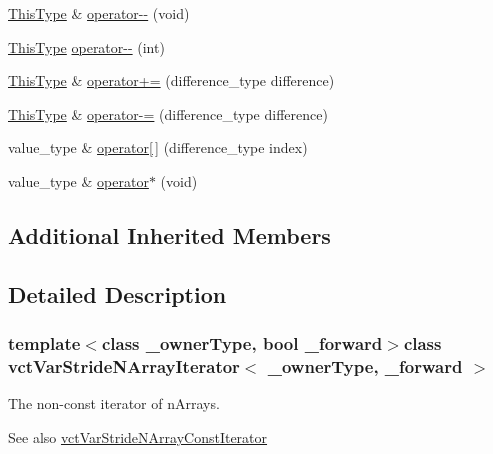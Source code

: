 \begin{DoxyCompactItemize}
\item 
\hyperlink{classvct_var_stride_n_array_const_iterator_ac729d2af265785aad6fdd43a70fbffdb}{This\+Type} \& \hyperlink{classvct_var_stride_n_array_iterator_a6dd95ef8683bfe4f0390b1d8596a858a}{operator-\/-\/} (void)
\item 
\hyperlink{classvct_var_stride_n_array_const_iterator_ac729d2af265785aad6fdd43a70fbffdb}{This\+Type} \hyperlink{classvct_var_stride_n_array_iterator_ad55f18e0117861f59d296f1b5a452164}{operator-\/-\/} (int)
\item 
\hyperlink{classvct_var_stride_n_array_const_iterator_ac729d2af265785aad6fdd43a70fbffdb}{This\+Type} \& \hyperlink{classvct_var_stride_n_array_iterator_a0351a9f203055ba0a2c4864670b96991}{operator+=} (difference\+\_\+type difference)
\item 
\hyperlink{classvct_var_stride_n_array_const_iterator_ac729d2af265785aad6fdd43a70fbffdb}{This\+Type} \& \hyperlink{classvct_var_stride_n_array_iterator_a425ef431bc52fd0bf8bacb3aaba76188}{operator-\/=} (difference\+\_\+type difference)
\item 
value\+\_\+type \& \hyperlink{classvct_var_stride_n_array_iterator_a6a32f0ed39083e58f7fd730626238d4a}{operator\mbox{[}$\,$\mbox{]}} (difference\+\_\+type index)
\item 
value\+\_\+type \& \hyperlink{classvct_var_stride_n_array_iterator_a10729a69529ebd104330f879bd8be454}{operator$\ast$} (void)
\end{DoxyCompactItemize}
\subsection*{Additional Inherited Members}


\subsection{Detailed Description}
\subsubsection*{template$<$class \+\_\+owner\+Type, bool \+\_\+forward$>$class vct\+Var\+Stride\+N\+Array\+Iterator$<$ \+\_\+owner\+Type, \+\_\+forward $>$}

The non-\/const iterator of n\+Arrays. \begin{DoxySeeAlso}{See also}
\hyperlink{classvct_var_stride_n_array_const_iterator}{vct\+Var\+Stride\+N\+Array\+Const\+Iterator} 
\end{DoxySeeAlso}


